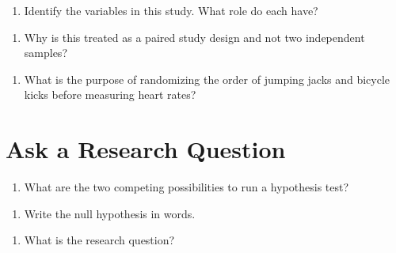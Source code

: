 \documentclass[
]{report}
\providecommand{\tightlist}{%
  \setlength{\itemsep}{0pt}\setlength{\parskip}{0pt}}
\begin{document}
\begin{enumerate}
\def\labelenumi{\arabic{enumi}.}
\setcounter{enumi}{1}
\tightlist
\item
  Identify the variables in this study. What role do each have?
\end{enumerate}

\vspace{1in}

\begin{enumerate}
\def\labelenumi{\arabic{enumi}.}
\setcounter{enumi}{2}
\tightlist
\item
  Why is this treated as a paired study design and not two independent samples?
\end{enumerate}

\vspace{1in}

\begin{enumerate}
\def\labelenumi{\arabic{enumi}.}
\setcounter{enumi}{3}
\tightlist
\item
  What is the purpose of randomizing the order of jumping jacks and bicycle kicks before measuring heart rates?
\end{enumerate}

\vspace{1in}

\hypertarget{ask-a-research-question}{%
\section{Ask a Research Question}\label{ask-a-research-question}}

\begin{enumerate}
\def\labelenumi{\arabic{enumi}.}
\setcounter{enumi}{4}
\tightlist
\item
  What are the two competing possibilities to run a hypothesis test?
\end{enumerate}

\vspace{1in}

\begin{enumerate}
\def\labelenumi{\arabic{enumi}.}
\setcounter{enumi}{5}
\tightlist
\item
  Write the null hypothesis in words.
\end{enumerate}

\vspace{1in}

\begin{enumerate}
\def\labelenumi{\arabic{enumi}.}
\setcounter{enumi}{6}
\tightlist
\item
  What is the research question?
\end{enumerate}
\end{document}

